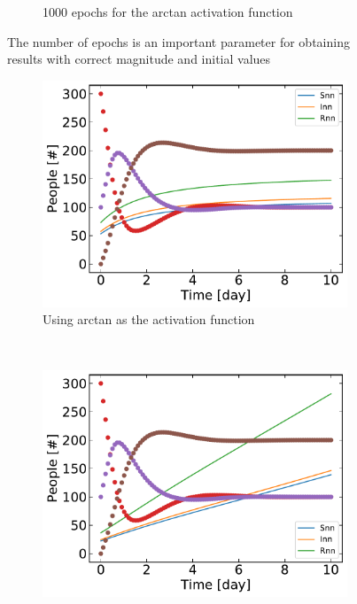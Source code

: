 \begin{figure}[H]
\begin{subfigure}{0.5\textwidth}
		\caption{1000 epochs for the arctan activation function}
	\end{subfigure}
	\caption{The number of epochs is an important parameter for obtaining results with correct magnitude and initial values}
	\end{figure}

	\begin{figure}[H]
	\centering
	\begin{subfigure}{0.5\textwidth}
		\centering
		\includegraphics[width=\linewidth]{result/Resultater_supervised/arctan_100_1000_0001.pdf}
		\caption{Using arctan as the activation function}
	\end{subfigure}%
	~ 
	\begin{subfigure}{0.5\textwidth}
		\centering
		\includegraphics[width=\linewidth]{result/Resultater_supervised/swish_100_1000_0001.pdf}

\end{subfigure}
\end{figure}
